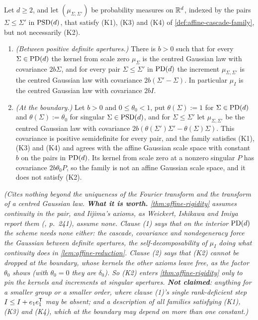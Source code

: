 \begin{proposition}
\label{prop:affine-rigidity-boundary}
\leanok
Let $d \ge 2$, and let $(\mu_{\Sigma,\Sigma'})$ be probability measures on $\mathbb{R}^d$, indexed by the pairs
$\Sigma \le \Sigma'$ in $\mathrm{PSD}(d)$, that satisfy (K1), (K3) and (K4) of \ref{def:affine-cascade-family}, but
not necessarily (K2).
\begin{enumerate}
\item \emph{(Between positive definite apertures.)} There is $b > 0$ such that for every $\Sigma \in \mathrm{PD}(d)$
the kernel from scale zero $\mu_\Sigma$ is the centred Gaussian law with covariance $2b\Sigma$, and for every
pair $\Sigma \le \Sigma'$ in $\mathrm{PD}(d)$ the increment $\mu_{\Sigma,\Sigma'}$ is the centred Gaussian law with
covariance $2b(\Sigma' - \Sigma)$. In particular $\mu_I$ is the centred Gaussian law with covariance $2bI$.
\item \emph{(At the boundary.)} Let $b > 0$ and $0 \le \theta_0 < 1$, put $\theta(\Sigma) := 1$ for
$\Sigma \in \mathrm{PD}(d)$ and $\theta(\Sigma) := \theta_0$ for singular $\Sigma \in \mathrm{PSD}(d)$, and for
$\Sigma \le \Sigma'$ let $\mu_{\Sigma,\Sigma'}$ be the centred Gaussian law with covariance
$2b(\theta(\Sigma')\Sigma' - \theta(\Sigma)\Sigma)$. This covariance is positive semidefinite for every pair,
and the family satisfies (K1), (K3) and (K4) and agrees with the affine Gaussian scale space with constant
$b$ on the pairs in $\mathrm{PD}(d)$. Its kernel from scale zero at a nonzero singular $P$ has covariance
$2b\theta_0P$, so the family is not an affine Gaussian scale space, and it does not satisfy (K2).
\end{enumerate}
\statusT\quad\emph{(Cites nothing beyond the uniqueness of the Fourier transform and the transform of a
centred Gaussian law. \textbf{What it is worth.} \ref{thm:affine-rigidity} assumes continuity in the pair,
and Iijima's axioms, as Weickert, Ishikawa and Imiya report them (, p.~241), assume
none. Clause (1) says that on
the interior $\mathrm{PD}(d)$ the scheme needs none either: the cascade, covariance and nondegeneracy force the
Gaussian between definite apertures, the self-decomposability of $\mu_I$ doing what continuity does in
\ref{lem:affine-reduction}. Clause (2) says that (K2) cannot be dropped at the boundary, whose kernels the
other axioms leave free, as the factor $\theta_0$ shows (with $\theta_0 = 0$ they are $\delta_0$). So (K2)
enters \ref{thm:affine-rigidity} only to pin the kernels and increments at singular apertures.
\textbf{Not claimed}: anything for a smaller group or a smaller order, where clause (1)'s single
rank-deficient step $I \le I + e_1e_1^{\mathsf{T}}$ may be absent; and a description of all families satisfying
(K1), (K3) and (K4), which at the boundary may depend on more than one constant.)}
\end{proposition}

